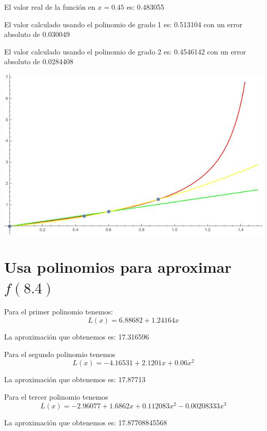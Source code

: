 \documentclass{article}
\begin{document}
El valor real de la función en $x=0.45$ es: 0.483055

El valor calculado usando el polinomio de grado 1 es: 0.513104 con un error absoluto de 0.030049

El valor calculado usando el polinomio de grado 2 es: 0.4546142 con un error absoluto de 0.0284408

\includegraphics[scale=0.5]{Grafica4.jpeg}

\section{Usa polinomios para aproximar $f(8.4)$}

Para el primer polinomio tenemos: 
$$L(x) = 6.88682 + 1.24164 x$$

La aproximación que obtenemos es: 17.316596

Para el segundo polinomio tenemos
$$L(x) = -4.16531+2.1201 x+0.06 x^2 $$

La aproximación que obtenemos es: 17.87713

Para el tercer polinomio tenemos
$$L(x) = -2.96077+1.6862 x+0.112083 x^2-0.00208333 x^3$$

La aproximación que obtenemos es: 17.87708845568
\end{document}
